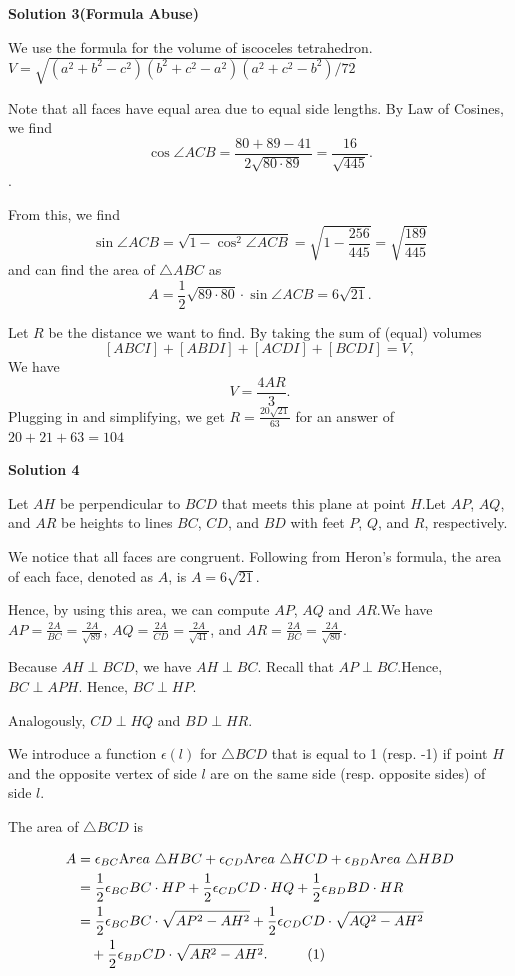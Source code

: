\begin{enumerate}
 



\textbf{Solution 3(Formula Abuse)}

We use the formula for the volume of iscoceles tetrahedron. $V = \sqrt{(a^2 + b^2 - c^2)(b^2 + c^2 - a^2)(a^2 + c^2 - b^2)/72}$

 Note that all faces have equal area due to equal side lengths. By Law of Cosines, we find 
 \[\cos{\angle ACB} = \frac{80 + 89 - 41}{2\sqrt{80\cdot 89}}= \frac{16}{\sqrt{445}}.\]. 

 From this, we find 
 \[\sin{\angle ACB} = \sqrt{1-\cos^2{\angle ACB}} = \sqrt{1 - \frac{256}{445}} = \sqrt{\frac{189}{445}}\] and can find the area of $\triangle ABC$ as 
 \[A = \frac{1}{2} \sqrt{89\cdot 80}\cdot \sin{\angle ACB} = 6\sqrt{21}.\]

 Let $R$ be the distance we want to find. By taking the sum of (equal) volumes 
 \[[ABCI] + [ABDI] + [ACDI] + [BCDI] = V,\]  We have 
 \[V = \frac{4AR}{3}.\] Plugging in and simplifying, we get $R = \frac{20\sqrt{21}}{63}$ for an answer of $20 + 21 + 63 = \boxed{104}$




\textbf{Solution 4}

Let $AH$ be perpendicular to $BCD$ that meets this plane at point $H$.Let $AP$, $AQ$, and $AR$ be heights to lines $BC$, $CD$, and $BD$ with feet $P$, $Q$, and $R$, respectively.

 We notice that all faces are congruent. Following from Heron's formula, the area of each face, denoted as $A$, is $A = 6 \sqrt{21}$.

 Hence, by using this area, we can compute $AP$, $AQ$ and $AR$.We have $AP = \frac{2 A}{BC} = \frac{2A}{\sqrt{89}}$, $AQ = \frac{2 A}{CD} = \frac{2A}{\sqrt{41}}$, and $AR = \frac{2 A}{BC} = \frac{2A}{\sqrt{80}}$.

 Because $AH \perp BCD$, we have $AH \perp BC$. Recall that $AP \perp BC$.Hence, $BC \perp APH$. Hence, $BC \perp HP$.

 Analogously, $CD \perp HQ$ and $BD \perp HR$.

 We introduce a function $\epsilon \left( l \right)$ for $\triangle BCD$ that is equal to 1 (resp. -1) if point $H$ and the opposite vertex of side $l$ are on the same side (resp. opposite sides) of side $l$.

 The area of $\triangle BCD$ is

 \begin{align*}A & = \epsilon_{BC} {\textrm Area} \ \triangle HBC+ \epsilon_{CD} {\textrm Area} \ \triangle HCD+ \epsilon_{BD} {\textrm Area} \ \triangle HBD \\& = \frac{1}{2} \epsilon_{BC} BC \cdot HP+ \frac{1}{2} \epsilon_{CD} CD \cdot HQ +\frac{1}{2} \epsilon_{BD} BD \cdot HR \\& = \frac{1}{2} \epsilon_{BC} BC \cdot \sqrt{AP^2 - AH^2}+ \frac{1}{2} \epsilon_{CD} CD \cdot \sqrt{AQ^2 - AH^2} \\& \quad + \frac{1}{2} \epsilon_{BD} CD \cdot \sqrt{AR^2 - AH^2} . \hspace{1cm} (1)\end{align*}



\end{enumerate}
